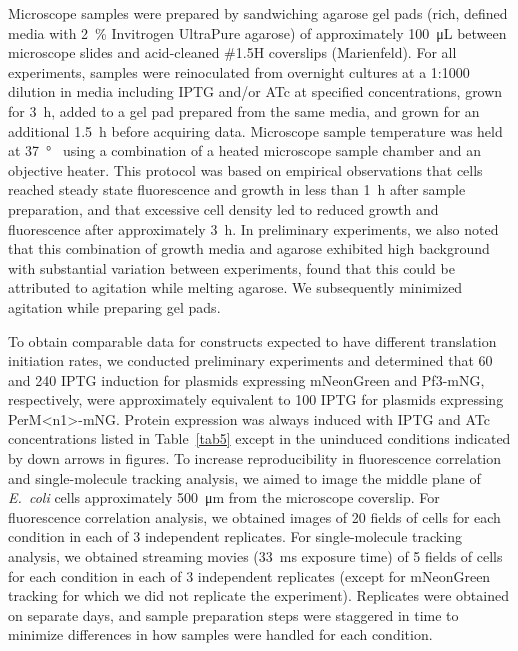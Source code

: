 \documentclass[twocolumn,pdflatex,sn-nature]{sn-jnl}%
\def\textsuperscript#1{<#1>}%
\newcommand\ec{\textit{E.~coli}}
\newcommand\permN{PerM\textsuperscript{n1}}
\begin{document}
Microscope samples were prepared by sandwiching agarose gel pads (rich, defined media with \qty{2}{\percent} Invitrogen UltraPure agarose) of approximately \qty{100}{\uL} between microscope slides and acid-cleaned \#1.5H coverslips (Marienfeld).
For all experiments, samples were reinoculated from overnight cultures at a 1:1000 dilution in media including IPTG and/or ATc at specified concentrations, grown for \qty{3}{\hour}, added to a gel pad prepared from the same media, and grown for an additional \qty{1.5}{\hour} before acquiring data.
Microscope sample temperature was held at \qty{37}{\degree\C} using a combination of a heated microscope sample chamber and an objective heater.
This protocol was based on empirical observations that cells reached steady state fluorescence and growth in less than \qty{1}{\hour} after sample preparation, and that excessive cell density led to reduced growth and fluorescence after approximately \qty{3}{\hour}.
In preliminary experiments, we also noted that this combination of growth media and agarose exhibited high background with substantial variation between experiments, found that this could be attributed to agitation while melting agarose.
We subsequently minimized agitation while preparing gel pads.

To obtain comparable data for constructs expected to have different translation initiation rates, we conducted preliminary experiments and determined that \qty{60}{\uM} and \qty{240}{\uM} IPTG induction for plasmids expressing mNeonGreen and Pf3-mNG, respectively, were approximately equivalent to \qty{100}{\uM} IPTG for plasmids expressing \permN{}-mNG.
Protein expression was always induced with IPTG and ATc concentrations listed in Table~\ref{tab5} except in the uninduced conditions indicated by down arrows in figures.
To increase reproducibility in fluorescence correlation and single-molecule tracking analysis, we aimed to image the middle plane of \ec{} cells approximately \qty{500}{\um} from the microscope coverslip.
For fluorescence correlation analysis, we obtained images of 20 fields of cells for each condition in each of 3 independent replicates.
For single-molecule tracking analysis, we obtained streaming movies (\qty{33}{\ms} exposure time) of 5 fields of cells for each condition in each of 3 independent replicates (except for mNeonGreen tracking for which we did not replicate the experiment).
Replicates were obtained on separate days, and sample preparation steps were staggered in time to minimize differences in how samples were handled for each condition.
\end{document}
